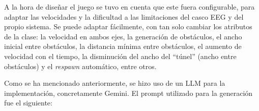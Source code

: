 A la hora de diseñar el juego se tuvo en cuenta que este fuera configurable, para adaptar las velocidades y la dificultad a las limitaciones del casco EEG y del propio sistema. Se puede adaptar fácilmente, con tan solo cambiar los atributos de la clase: la velocidad en ambos ejes, la generación de obstáculos, el ancho inicial entre obstáculos, la distancia mínima entre obstáculos, el aumento de velocidad con el tiempo, la disminución del ancho del ``túnel'' (ancho entre obstáculos) y el \textit{respawn} automático, entre otros.

Como se ha mencionado anteriormente, se hizo uso de un LLM para la implementación, concretamente Gemini. El prompt utilizado para la generación fue el siguiente:

\begingroup %

\emergencystretch=0pt

